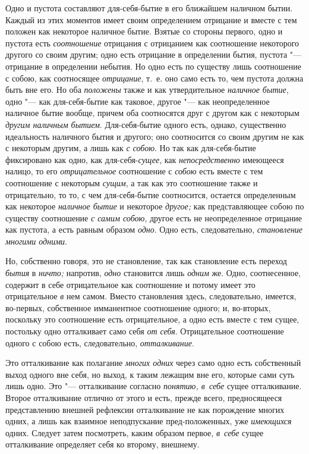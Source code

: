 Одно и пустота составляют для-себя-бытие в его ближайшем наличном бытии.
Каждый из этих моментов имеет своим определением отрицание и вместе с тем
положен как некоторое наличное бытие. Взятые со стороны первого, одно и
пустота есть {\em соотношение} отрицания с отрицанием
как соотношение некоторого другого со своим другим; одно есть отрицание в
определении бытия, пустота "--- отрицание в определении небытия. Но одно есть
по существу лишь соотношение с собою, как соотносящее
{\em отрицание}, т.~е. оно само есть то, чем пустота
должна быть вне его. Но оба {\em положены} также и как
утвердительное {\em наличное бытие}, одно "--- как
для-себя-бытие как таковое, другое "--- как неопределенное наличное бытие
вообще, причем оба соотносятся друг с другом как с некоторым
{\em другим наличным бытием}. Для-себя-бытие одного
есть, однако, существенно идеальность наличного бытия и другого; оно
соотносится со своим другим не как с некоторым другим, а лишь как
{\em с собою}. Но так как для-себя-бытие фиксировано
как одно, как для-себя-{\em сущее}, как
{\em непосредственно} имеющееся налицо, то его
{\em отрицательное} соотношение с
{\em собою} есть вместе с тем соотношение с некоторым
{\em сущим}, а так как это соотношение также и
отрицательно, то то, с чем для-себя-бытие соотносится, остается
определенным как некоторое {\em наличное бытие} и
некоторое {\em другое;} как представляющее собою по
существу соотношение {\em с самим собою}, другое есть
не неопределенное отрицание как пустота, а есть равным образом
{\em одно}. Одно есть, следовательно, {\em становление многими одними}.

Но, собственно говоря, это не становление, так как становление есть переход
{\em бытия} в {\em ничто;} напротив, {\em одно} становится лишь
{\em одним} же. Одно, соотнесенное, содержит в себе
отрицательное как соотношение и потому имеет это отрицательное
{\em в} нем самом. Вместо становления здесь,
следовательно, имеется, во-первых, собственное имманентное соотношение
одного; и, во-вторых, поскольку это соотношение есть отрицательное, а одно
есть вместе с тем сущее, постольку одно отталкивает само себя
{\em от себя}. Отрицательное соотношение одного с собою
есть, следовательно, {\em отталкивание}.

Это отталкивание как полагание {\em многих одних} через
само одно есть собственный выход одного вне себя, но выход, к таким лежащим
вне его, которые сами суть лишь одно. Это "--- отталкивание согласно
{\em понятию, в~себе} сущее
отталкивание. Второе отталкивание отлично от этого и есть, прежде всего,
предносящееся представлению внешней рефлексии отталкивание не как
порождение многих одних, а лишь как взаимное неподпускание пред-положенных,
уже {\em имеющихся} одних. Следует затем посмотреть,
каким образом первое, {\em в~себе} сущее отталкивание
определяет себя ко второму, внешнему.

